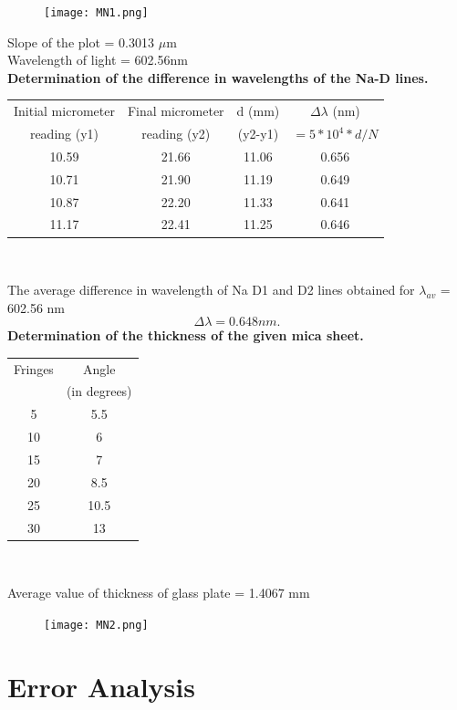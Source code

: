 \documentclass[12pt]{report}
\begin{document}
	\begin{figure}[h]
		\centering
		\texttt{[image: MN1.png]}
	\end{figure}
	Slope of the plot = 0.3013 $\mu$m\\
	Wavelength of light = 602.56nm\\
	\newpage
	\textbf{Determination of the difference in wavelengths of the Na-D lines.}
	\begin{center}
		\begin{tabular}{ |c|c|c|c| } 
			\hline
			Initial micrometer&Final micrometer& d (mm) & $\Delta \lambda$ (nm)\\
			reading (y1) &reading (y2)&(y2-y1)&$=5*10^4*d/N$\\
			\hline
			10.59 & 21.66 & 11.06 & 0.656 \\
			10.71 & 21.90 & 11.19 & 0.649 \\
			10.87 & 22.20 & 11.33 & 0.641 \\
			11.17 & 22.41 & 11.25 & 0.646 \\
			\hline
		\end{tabular}
		\\
	\end{center}
	The average difference in wavelength of Na D1 and D2 lines obtained for $\lambda_{av}$ = 602.56 nm\\
	$$\Delta\lambda = 0.648 nm.$$
	\textbf{Determination of the thickness of the given mica sheet.}
	\begin{center}
		\begin{tabular}{ |c|c| }
			\hline
			Fringes & Angle \\ 
			& (in degrees) \\ \hline
			5       & 5.5   \\
			10      & 6     \\
			15      & 7     \\
			20      & 8.5   \\
			25      & 10.5  \\
			30      & 13   \\
			\hline
		\end{tabular}
		\\
	\end{center}
	Average value of thickness of glass plate = 1.4067 mm
	\newpage
	\begin{figure}[h]
		\centering
		\texttt{[image: MN2.png]}
	\end{figure}
	
	
	\chapter{Error Analysis}
\end{document}
